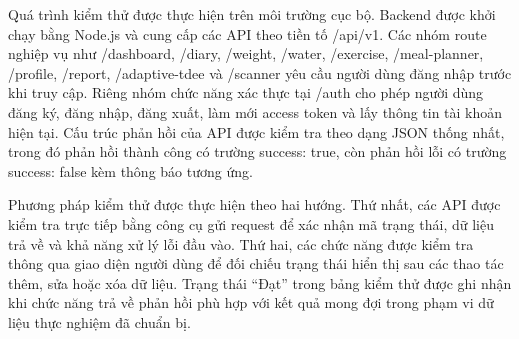 \documentclass[12pt, a4paper]{report}
\begin{document}
Quá trình kiểm thử được thực hiện trên môi trường cục bộ. Backend được khởi chạy bằng Node.js và cung cấp các API theo tiền tố /api/v1. Các nhóm route nghiệp vụ như /dashboard, /diary, /weight, /water, /exercise, /meal-planner, /profile, /report, /adaptive-tdee và /scanner yêu cầu người dùng đăng nhập trước khi truy cập. Riêng nhóm chức năng xác thực tại /auth cho phép người dùng đăng ký, đăng nhập, đăng xuất, làm mới access token và lấy thông tin tài khoản hiện tại. Cấu trúc phản hồi của API được kiểm tra theo dạng JSON thống nhất, trong đó phản hồi thành công có trường success: true, còn phản hồi lỗi có trường success: false kèm thông báo tương ứng.

Phương pháp kiểm thử được thực hiện theo hai hướng. Thứ nhất, các API được kiểm tra trực tiếp bằng công cụ gửi request để xác nhận mã trạng thái, dữ liệu trả về và khả năng xử lý lỗi đầu vào. Thứ hai, các chức năng được kiểm tra thông qua giao diện người dùng để đối chiếu trạng thái hiển thị sau các thao tác thêm, sửa hoặc xóa dữ liệu. Trạng thái “Đạt” trong bảng kiểm thử được ghi nhận khi chức năng trả về phản hồi phù hợp với kết quả mong đợi trong phạm vi dữ liệu thực nghiệm đã chuẩn bị.
\end{document}
